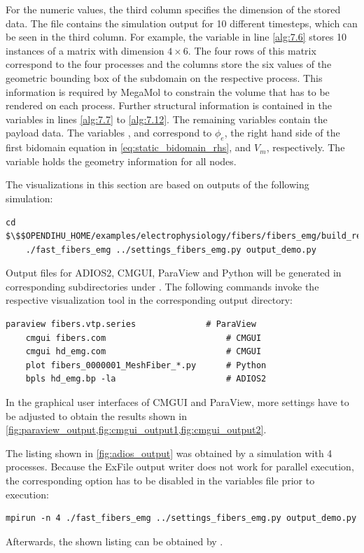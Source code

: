For the numeric values, the third column specifies the dimension of the stored data. The file contains the simulation output for 10 different timesteps, which can be seen in the third column. For example, the  variable in line \ref{alg:7.6} stores 10 instances of a matrix with dimension $4\times 6$. The four rows of this matrix correspond to the four processes and the columns store the six values of the geometric bounding box of the subdomain on the respective process. This information is required by MegaMol to constrain the volume that has to be rendered on each process. Further structural information is contained in the variables in lines \ref{alg:7.7} to \ref{alg:7.12}. 
The remaining variables contain the payload data.  The variables ,  and  correspond to $\phi_e$, the right hand side of the first bidomain equation in \cref{eq:static_bidomain_rhs}, and $V_m$, respectively. The variable   holds the geometry information for all nodes.


\begin{reproduce_no_break}
  The visualizations in this section are based on outputs of the following simulation:
  \begin{lstlisting}[columns=fullflexible,breaklines=true,postbreak=\mbox{\textcolor{gray}{$\hookrightarrow$}\space}]
    cd $\$$OPENDIHU_HOME/examples/electrophysiology/fibers/fibers_emg/build_release
    ./fast_fibers_emg ../settings_fibers_emg.py output_demo.py
  \end{lstlisting}
  
  Output files for ADIOS2, CMGUI, ParaView and Python will be generated in corresponding subdirectories under .
  The following commands invoke the respective visualization tool in the corresponding output directory:
  \begin{lstlisting}[columns=fullflexible,breaklines=true,postbreak=\mbox{\textcolor{gray}{$\hookrightarrow$}\space}]
    paraview fibers.vtp.series              # ParaView
    cmgui fibers.com                        # CMGUI
    cmgui hd_emg.com                        # CMGUI
    plot fibers_0000001_MeshFiber_*.py      # Python
    bpls hd_emg.bp -la                      # ADIOS2
  \end{lstlisting}
  In the graphical user interfaces of CMGUI and ParaView, more settings have to be adjusted to obtain the results shown in \cref{fig:paraview_output,fig:cmgui_output1,fig:cmgui_output2}.
  
  The listing shown in \cref{fig:adios_output} was obtained by a simulation with 4 processes. 
  Because the ExFile output writer does not work for parallel execution, the corresponding option has to be disabled in the  variables file prior to execution:
  \begin{lstlisting}[columns=fullflexible,breaklines=true,postbreak=\mbox{\textcolor{gray}{$\hookrightarrow$}\space}]
    mpirun -n 4 ./fast_fibers_emg ../settings_fibers_emg.py output_demo.py
  \end{lstlisting}
  Afterwards, the shown listing can be obtained by .
\end{reproduce_no_break}

